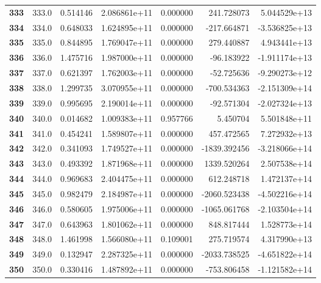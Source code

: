 \documentclass{report}[12pt]
\begin{document}
\begin{center}
\begin{tabular}{lrrrrrr}
\textbf{333 } &          333.0 &   0.514146 &  2.086861e+11 &    0.000000 &   241.728073 &  5.044529e+13 \\
\textbf{334 } &          334.0 &   0.648033 &  1.624895e+11 &    0.000000 &  -217.664871 & -3.536825e+13 \\
\textbf{335 } &          335.0 &   0.844895 &  1.769047e+11 &    0.000000 &   279.440887 &  4.943441e+13 \\
\textbf{336 } &          336.0 &   1.475716 &  1.987000e+11 &    0.000000 &   -96.183922 & -1.911174e+13 \\
\textbf{337 } &          337.0 &   0.621397 &  1.762003e+11 &    0.000000 &   -52.725636 & -9.290273e+12 \\
\textbf{338 } &          338.0 &   1.299735 &  3.070955e+11 &    0.000000 &  -700.534363 & -2.151309e+14 \\
\textbf{339 } &          339.0 &   0.995695 &  2.190014e+11 &    0.000000 &   -92.571304 & -2.027324e+13 \\
\textbf{340 } &          340.0 &   0.014682 &  1.009383e+11 &    0.957766 &     5.450704 &  5.501848e+11 \\
\textbf{341 } &          341.0 &   0.454241 &  1.589807e+11 &    0.000000 &   457.472565 &  7.272932e+13 \\
\textbf{342 } &          342.0 &   0.341093 &  1.749527e+11 &    0.000000 & -1839.392456 & -3.218066e+14 \\
\textbf{343 } &          343.0 &   0.493392 &  1.871968e+11 &    0.000000 &  1339.520264 &  2.507538e+14 \\
\textbf{344 } &          344.0 &   0.969683 &  2.404475e+11 &    0.000000 &   612.248718 &  1.472137e+14 \\
\textbf{345 } &          345.0 &   0.982479 &  2.184987e+11 &    0.000000 & -2060.523438 & -4.502216e+14 \\
\textbf{346 } &          346.0 &   0.580605 &  1.975006e+11 &    0.000000 & -1065.061768 & -2.103504e+14 \\
\textbf{347 } &          347.0 &   0.643963 &  1.801062e+11 &    0.000000 &   848.817444 &  1.528773e+14 \\
\textbf{348 } &          348.0 &   1.461998 &  1.566080e+11 &    0.109001 &   275.719574 &  4.317990e+13 \\
\textbf{349 } &          349.0 &   0.132947 &  2.287325e+11 &    0.000000 & -2033.738525 & -4.651822e+14 \\
\textbf{350 } &          350.0 &   0.330416 &  1.487892e+11 &    0.000000 &  -753.806458 & -1.121582e+14 \\

\end{tabular}
\end{center}
\end{document}
